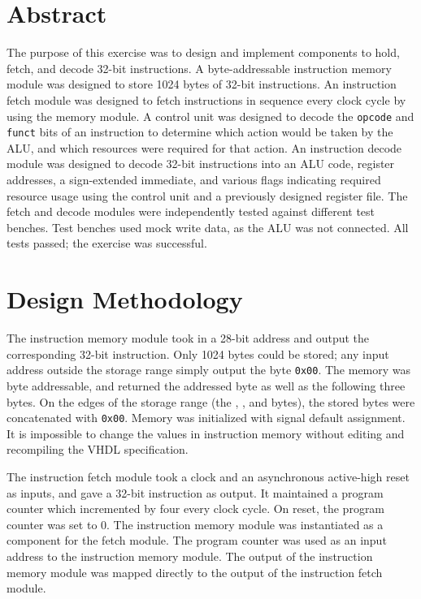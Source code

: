 \documentclass[CMPE]{KGCOEReport}
\begin{document}
\maketitle

\section*{Abstract}

The purpose of this exercise was to design and implement components to hold,
fetch, and decode 32-bit instructions. A byte-addressable instruction memory
module was designed to store 1024 bytes of 32-bit instructions. An instruction
fetch module was designed to fetch instructions in sequence every clock cycle by
using the memory module. A control unit was designed to decode the
\texttt{opcode} and \texttt{funct} bits of an instruction to determine which
action would be taken by the ALU, and which resources were required for that
action. An instruction decode module was designed to decode 32-bit instructions
into an ALU code, register addresses, a sign-extended immediate, and various
flags indicating required resource usage using the control unit and a
previously designed register file. The fetch and decode modules were
independently tested against different test benches. Test benches used mock
write data, as the ALU was not connected. All tests passed; the exercise was
successful.

\section*{Design Methodology}

The instruction memory module took in a 28-bit address and output the
corresponding 32-bit instruction. Only 1024 bytes could be stored; any input
address outside the storage range simply output the byte \texttt{0x00}. The
memory was byte addressable, and returned the addressed byte as well as the
following three bytes. On the edges of the storage range (the ,
, and  bytes), the stored bytes were concatenated with
\texttt{0x00}. Memory was initialized with signal default assignment. It is
impossible to change the values in instruction memory without editing and
recompiling the VHDL specification.

The instruction fetch module took a clock and an asynchronous active-high reset
as inputs, and gave a 32-bit instruction as output. It maintained a program
counter which incremented by four every clock cycle. On reset, the program
counter was set to 0. The instruction memory module was instantiated as a
component for the fetch module. The program counter was used as an input
address to the instruction memory module. The output of the instruction memory
module was mapped directly to the output of the instruction fetch module.
\end{document}
